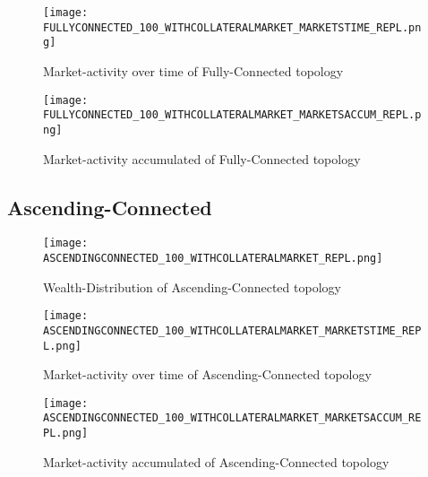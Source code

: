 \documentclass[Bachelorarbeit.tex]{subfiles}
\begin{document}
\begin{figure}[H]
	\centering
  \texttt{[image: FULLYCONNECTED\_100\_WITHCOLLATERALMARKET\_MARKETSTIME\_REPL.png]}
  	\caption{Market-activity over time of Fully-Connected topology}
	\label{fig:wealth_FULLYCONNECTED_100_WITHCOLLATERALMARKET_MARKETSTIME_REPL}
\end{figure}

\begin{figure}[H]
	\centering
  \texttt{[image: FULLYCONNECTED\_100\_WITHCOLLATERALMARKET\_MARKETSACCUM\_REPL.png]}
	\caption{Market-activity accumulated of Fully-Connected topology}
	\label{fig:wealth_FULLYCONNECTED_100_WITHCOLLATERALMARKET_MARKETSACCUM_REPL}
\end{figure}

\subsection{Ascending-Connected}
\begin{figure}[H]
	\centering
  \texttt{[image: ASCENDINGCONNECTED\_100\_WITHCOLLATERALMARKET\_REPL.png]}
	\caption{Wealth-Distribution of Ascending-Connected topology}
	\label{fig:wealth_ASCENDINGCONNECTED_100_WITHCOLLATERALMARKET_REPL}
\end{figure}

\begin{figure}[H]
	\centering
  \texttt{[image: ASCENDINGCONNECTED\_100\_WITHCOLLATERALMARKET\_MARKETSTIME\_REPL.png]}
	\caption{Market-activity over time of Ascending-Connected topology}
	\label{fig:wealth_ASCENDINGCONNECTED_100_WITHCOLLATERALMARKET_MARKETSTIME_REPL}
\end{figure}

\begin{figure}[H]
	\centering
  \texttt{[image: ASCENDINGCONNECTED\_100\_WITHCOLLATERALMARKET\_MARKETSACCUM\_REPL.png]}
	\caption{Market-activity accumulated of Ascending-Connected topology}
	\label{fig:wealth_ASCENDINGCONNECTED_100_WITHCOLLATERALMARKET_MARKETSACCUM_REPL}
\end{figure}
\end{document}
